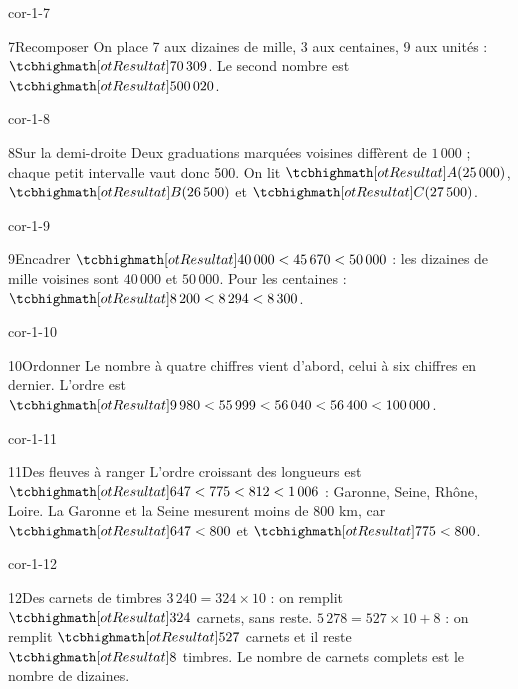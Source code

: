 \begin{blocLivre}{cor-1-7}\begin{corrige}{7}{Recomposer}
On place 7 aux dizaines de mille, 3 aux centaines, 9 aux unités : $\res{70\,309}$. Le second nombre est $\res{500\,020}$.
\end{corrige}\end{blocLivre}
\begin{blocLivre}{cor-1-8}\begin{corrige}{8}{Sur la demi-droite}
Deux graduations marquées voisines diffèrent de $1\,000$ ; chaque petit intervalle vaut donc 500. On lit $\res{A(25\,000)}$, $\res{B(26\,500)}$ et $\res{C(27\,500)}$.
\label{fig-cor-1-8}
\end{corrige}\end{blocLivre}
\begin{blocLivre}{cor-1-9}\begin{corrige}{9}{Encadrer}
$\res{40\,000<45\,670<50\,000}$ : les dizaines de mille voisines sont $40\,000$ et $50\,000$. Pour les centaines : $\res{8\,200<8\,294<8\,300}$.
\end{corrige}\end{blocLivre}
\begin{blocLivre}{cor-1-10}\begin{corrige}{10}{Ordonner}
Le nombre à quatre chiffres vient d’abord, celui à six chiffres en dernier. L’ordre est $\res{9\,980<55\,999<56\,040<56\,400<100\,000}$.
\end{corrige}\end{blocLivre}
\begin{blocLivre}{cor-1-11}\begin{corrige}{11}{Des fleuves à ranger}
L’ordre croissant des longueurs est $\res{647<775<812<1\,006}$ : Garonne, Seine, Rhône, Loire. La Garonne et la Seine mesurent moins de 800 km, car $\res{647<800}$ et $\res{775<800}$.
\end{corrige}\end{blocLivre}
\begin{blocLivre}{cor-1-12}\begin{corrige}{12}{Des carnets de timbres}
$3\,240=324\times10$ : on remplit $\res{324}$ carnets, sans reste. $5\,278=527\times10+8$ : on remplit $\res{527}$ carnets et il reste $\res8$ timbres. Le nombre de carnets complets est le nombre de dizaines.
\end{corrige}\end{blocLivre}

